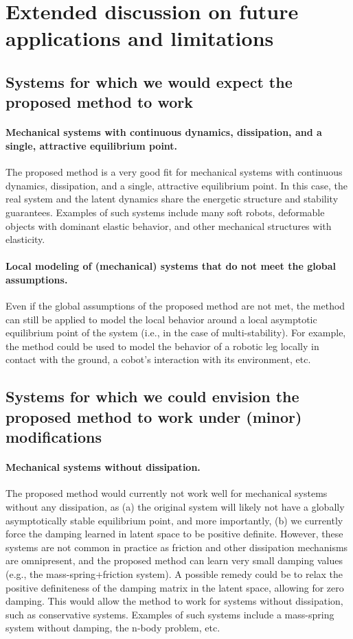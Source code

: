 \section{Extended discussion on future applications and limitations}\label{apx:sec:limitations}

\subsection{Systems for which we would expect the proposed method to work}
\paragraph{Mechanical systems with continuous dynamics, dissipation, and a single, attractive equilibrium point.}
The proposed method is a very good fit for mechanical systems with continuous dynamics, dissipation, and a single, attractive equilibrium point. In this case, the real system and the latent dynamics share the energetic structure and stability guarantees. Examples of such systems include many soft robots, deformable objects with dominant elastic behavior, and other mechanical structures with elasticity.

\paragraph{Local modeling of (mechanical) systems that do not meet the global assumptions.}
Even if the global assumptions of the proposed method are not met, the method can still be applied to model the local behavior around a local asymptotic equilibrium point of the system (i.e., in the case of multi-stability). For example, the method could be used to model the behavior of a robotic leg locally in contact with the ground, a cobot's interaction with its environment, etc.

\subsection{Systems for which we could envision the proposed method to work under (minor) modifications}
\paragraph{Mechanical systems without dissipation.}
The proposed method would currently not work well for mechanical systems without any dissipation, as (a) the original system will likely not have a globally asymptotically stable equilibrium point, and more importantly, (b) we currently force the damping learned in latent space to be positive definite. However, these systems are not common in practice as friction and other dissipation mechanisms are omnipresent, and the proposed method can learn very small damping values (e.g., the mass-spring+friction system). A possible remedy could be to relax the positive definiteness of the damping matrix in the latent space, allowing for zero damping. This would allow the method to work for systems without dissipation, such as conservative systems. Examples of such systems include a mass-spring system without damping, the n-body problem, etc.

